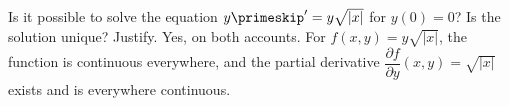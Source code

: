 {Is it possible to solve the equation $y\primeskip' = y\sqrt{\lvert x\rvert}$ for
$y(0) = 0$?  Is the solution unique?
Justify.}
{Yes, on both accounts. For $f(x,y)=y\sqrt{\lvert x\rvert}$, the function is continuous everywhere, and the partial derivative $\dfrac{\partial f}{\partial y}(x,y) = \sqrt{\lvert x\rvert}$ exists and is everywhere continuous.
}